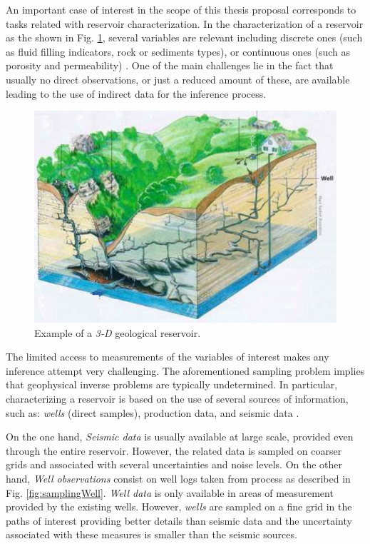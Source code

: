 An important case of interest in the scope of this thesis proposal corresponds to tasks related with reservoir characterization. In the characterization of a reservoir as the shown in Fig. \ref{fig:example3Dreservoir}, several variables are relevant including discrete ones (such as fluid filling indicators, rock or sediments types), or continuous ones (such as porosity and permeability) \cite{katanidis_1997_a,Strebelle_2004a,Oliver_2008_a}. One of the main challenges lie in the fact that usually no direct observations, or just a reduced amount of these, are available leading to the use of indirect data for the inference process.


		\begin{figure}[H]
		\centering
		\includegraphics[width=0.37	\textwidth]{Figs_QE/reservoir3D_1}

		\caption{Example of a \emph{3-D} geological reservoir.}
		\label{fig:example3Dreservoir}
		\end{figure}

The limited access to measurements of the variables of interest makes any inference attempt very challenging. The aforementioned sampling problem implies that geophysical inverse problems are typically undetermined. In particular, characterizing a reservoir is based on the use of several sources of information, such as: \emph{wells} (direct samples), production data, and seismic data \cite{Oliver_2008_a,GuyagulerBaris2002_a,krause08efficient,olea_84_a}. 

On the one hand, \emph{Seismic data} is usually available at large scale, provided even through the entire reservoir. However, the related data is sampled on coarser grids and associated with several uncertainties and noise levels. On the other hand, \emph{Well observations} consist on well logs taken from process as described in Fig. \ref{fig:samplingWell}. \emph{Well data} is only available in areas of measurement provided by the existing wells. However, \emph{wells} are sampled on a fine grid in the paths of interest providing better details than seismic data and the uncertainty associated with these measures is smaller than the seismic sources.


